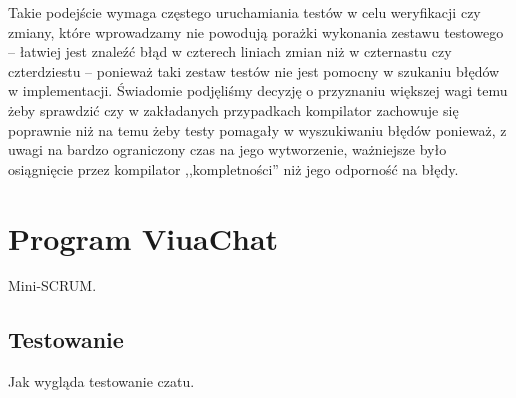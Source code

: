 Takie podejście wymaga częstego uruchamiania testów w celu weryfikacji czy
zmiany, które wprowadzamy nie powodują porażki wykonania zestawu testowego --
łatwiej jest znaleźć błąd w czterech liniach zmian niż w czternastu czy
czterdziestu -- ponieważ taki zestaw testów nie jest pomocny w szukaniu błędów w
implementacji. Świadomie podjęliśmy decyzję o przyznaniu większej wagi temu żeby
sprawdzić czy w zakładanych przypadkach kompilator zachowuje się poprawnie niż
na temu żeby testy pomagały w wyszukiwaniu błędów ponieważ, z uwagi na bardzo
ograniczony czas na jego wytworzenie, ważniejsze było osiągnięcie przez
kompilator ,,kompletności'' niż jego odporność na błędy.

\section{Program ViuaChat}

Mini-SCRUM.

\subsection{Testowanie}

Jak wygląda testowanie czatu.
